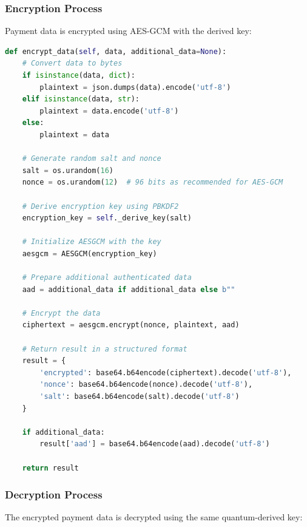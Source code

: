 \documentclass[onecolumn,a4paper,10pt]{IEEEtran}
\begin{document}
\subsubsection{Encryption Process}
Payment data is encrypted using AES-GCM with the derived key:

\begin{lstlisting}[language=Python, caption=Data Encryption Using Quantum Key]
def encrypt_data(self, data, additional_data=None):
    # Convert data to bytes
    if isinstance(data, dict):
        plaintext = json.dumps(data).encode('utf-8')
    elif isinstance(data, str):
        plaintext = data.encode('utf-8')
    else:
        plaintext = data
    
    # Generate random salt and nonce
    salt = os.urandom(16)
    nonce = os.urandom(12)  # 96 bits as recommended for AES-GCM
    
    # Derive encryption key using PBKDF2
    encryption_key = self._derive_key(salt)
    
    # Initialize AESGCM with the key
    aesgcm = AESGCM(encryption_key)
    
    # Prepare additional authenticated data
    aad = additional_data if additional_data else b""
    
    # Encrypt the data
    ciphertext = aesgcm.encrypt(nonce, plaintext, aad)
    
    # Return result in a structured format
    result = {
        'encrypted': base64.b64encode(ciphertext).decode('utf-8'),
        'nonce': base64.b64encode(nonce).decode('utf-8'),
        'salt': base64.b64encode(salt).decode('utf-8')
    }
    
    if additional_data:
        result['aad'] = base64.b64encode(aad).decode('utf-8')
    
    return result
\end{lstlisting}

\subsubsection{Decryption Process}
The encrypted payment data is decrypted using the same quantum-derived key:
\end{document}

